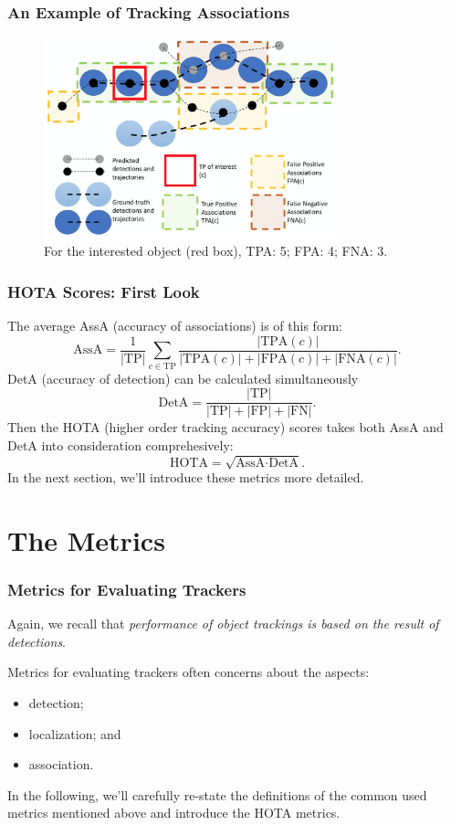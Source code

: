 \documentclass[slidetop, mathserif]{beamer}
\begin{document}
\begin{frame}
	\frametitle{An Example of Tracking Associations}
	\begin{figure}
		\includegraphics[width=240pt]{pics/fig8.png}
		\caption{For the interested object (red box), TPA: 5; FPA: 4; FNA: 3.}
	\end{figure}
\end{frame}

\begin{frame}
	\frametitle{HOTA Scores: First Look}

	The average AssA (accuracy of associations) is of this form:
	\[
		\text{AssA} = \dfrac{1}{|\text{TP}|} \sum_{c\in\text{TP}} \dfrac{|\text{TPA}(c)|}{|\text{TPA}(c)|+|\text{FPA}(c)|+|\text{FNA}(c)|}.
	\]
	DetA (accuracy of detection) can be calculated simultaneously
	\[
		\text{DetA} = \dfrac{|\text{TP}|}{|\text{TP}| +|\text{FP}| + |\text{FN}|}.
	\]
	Then the HOTA (higher order tracking accuracy) scores takes both
	AssA and DetA into consideration comprehesively:
	\[
		\text{HOTA} = \sqrt{\text{AssA} \cdot \text{DetA}}.
	\]
	In the next section, we'll introduce these metrics more detailed.

\end{frame}

\section{The Metrics}

\begin{frame}
	\frametitle{Metrics for Evaluating Trackers}
			
	Again, we recall that \emph{performance of object trackings is based 
	on the result of detections}.
			
	\vspace{5pt}

	Metrics for evaluating trackers often concerns about the aspects:
	\begin{itemize}
		\item detection;%
		\item localization; and%
		\item association.%
	\end{itemize}

	In the following, we'll carefully re-state the definitions of the
	common used metrics
	mentioned above and introduce the HOTA metrics.

\end{frame}
\end{document}
